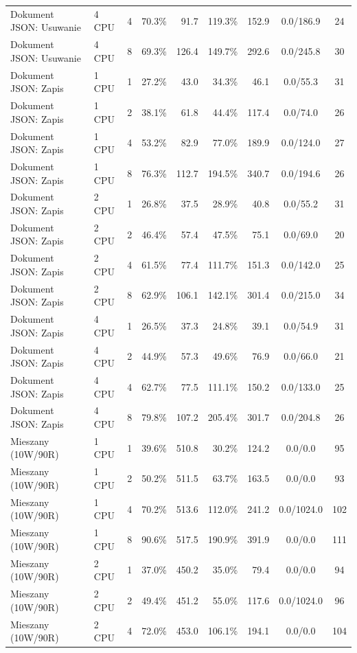 \begin{table}[ht]
{\begin{tabular}{llcrrrrcc}
Dokument JSON: Usuwanie & 4 CPU & 4 & 70.3\% & 91.7 & 119.3\% & 152.9 & 0.0/186.9 & 24 \\
Dokument JSON: Usuwanie & 4 CPU & 8 & 69.3\% & 126.4 & 149.7\% & 292.6 & 0.0/245.8 & 30 \\
Dokument JSON: Zapis & 1 CPU & 1 & 27.2\% & 43.0 & 34.3\% & 46.1 & 0.0/55.3 & 31 \\
Dokument JSON: Zapis & 1 CPU & 2 & 38.1\% & 61.8 & 44.4\% & 117.4 & 0.0/74.0 & 26 \\
Dokument JSON: Zapis & 1 CPU & 4 & 53.2\% & 82.9 & 77.0\% & 189.9 & 0.0/124.0 & 27 \\
Dokument JSON: Zapis & 1 CPU & 8 & 76.3\% & 112.7 & 194.5\% & 340.7 & 0.0/194.6 & 26 \\
Dokument JSON: Zapis & 2 CPU & 1 & 26.8\% & 37.5 & 28.9\% & 40.8 & 0.0/55.2 & 31 \\
Dokument JSON: Zapis & 2 CPU & 2 & 46.4\% & 57.4 & 47.5\% & 75.1 & 0.0/69.0 & 20 \\
Dokument JSON: Zapis & 2 CPU & 4 & 61.5\% & 77.4 & 111.7\% & 151.3 & 0.0/142.0 & 25 \\
Dokument JSON: Zapis & 2 CPU & 8 & 62.9\% & 106.1 & 142.1\% & 301.4 & 0.0/215.0 & 34 \\
Dokument JSON: Zapis & 4 CPU & 1 & 26.5\% & 37.3 & 24.8\% & 39.1 & 0.0/54.9 & 31 \\
Dokument JSON: Zapis & 4 CPU & 2 & 44.9\% & 57.3 & 49.6\% & 76.9 & 0.0/66.0 & 21 \\
Dokument JSON: Zapis & 4 CPU & 4 & 62.7\% & 77.5 & 111.1\% & 150.2 & 0.0/133.0 & 25 \\
Dokument JSON: Zapis & 4 CPU & 8 & 79.8\% & 107.2 & 205.4\% & 301.7 & 0.0/204.8 & 26 \\
Mieszany (10W/90R) & 1 CPU & 1 & 39.6\% & 510.8 & 30.2\% & 124.2 & 0.0/0.0 & 95 \\
Mieszany (10W/90R) & 1 CPU & 2 & 50.2\% & 511.5 & 63.7\% & 163.5 & 0.0/0.0 & 93 \\
Mieszany (10W/90R) & 1 CPU & 4 & 70.2\% & 513.6 & 112.0\% & 241.2 & 0.0/1024.0 & 102 \\
Mieszany (10W/90R) & 1 CPU & 8 & 90.6\% & 517.5 & 190.9\% & 391.9 & 0.0/0.0 & 111 \\
Mieszany (10W/90R) & 2 CPU & 1 & 37.0\% & 450.2 & 35.0\% & 79.4 & 0.0/0.0 & 94 \\
Mieszany (10W/90R) & 2 CPU & 2 & 49.4\% & 451.2 & 55.0\% & 117.6 & 0.0/1024.0 & 96 \\
Mieszany (10W/90R) & 2 CPU & 4 & 72.0\% & 453.0 & 106.1\% & 194.1 & 0.0/0.0 & 104 \\

\end{tabular}}
\end{table}
